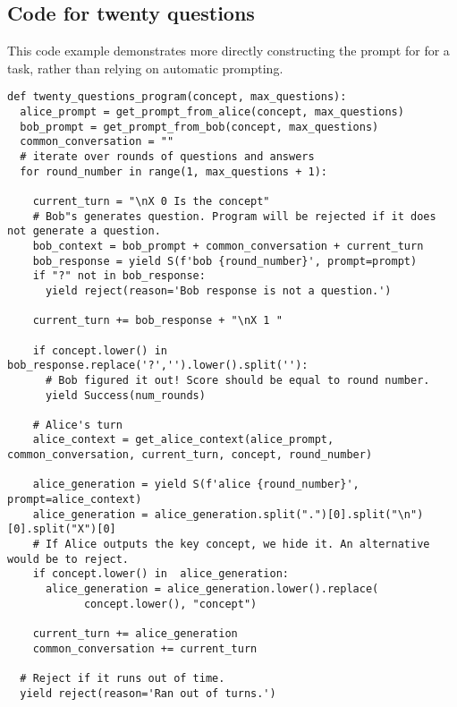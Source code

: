 \subsection{Code for twenty questions}
\label{sec:twentyCode}

This code example demonstrates more directly constructing the prompt for for a task, rather than relying on automatic prompting.
\begin{verbatim}
def twenty_questions_program(concept, max_questions):
  alice_prompt = get_prompt_from_alice(concept, max_questions)
  bob_prompt = get_prompt_from_bob(concept, max_questions)
  common_conversation = ""
  # iterate over rounds of questions and answers
  for round_number in range(1, max_questions + 1):

    current_turn = "\nX 0 Is the concept"
    # Bob"s generates question. Program will be rejected if it does not generate a question.
    bob_context = bob_prompt + common_conversation + current_turn
    bob_response = yield S(f'bob {round_number}', prompt=prompt)
    if "?" not in bob_response:
      yield reject(reason='Bob response is not a question.')

    current_turn += bob_response + "\nX 1 "

    if concept.lower() in bob_response.replace('?','').lower().split(''):
      # Bob figured it out! Score should be equal to round number.
      yield Success(num_rounds)

    # Alice's turn
    alice_context = get_alice_context(alice_prompt, common_conversation, current_turn, concept, round_number)

    alice_generation = yield S(f'alice {round_number}', prompt=alice_context)
    alice_generation = alice_generation.split(".")[0].split("\n")[0].split("X")[0]
    # If Alice outputs the key concept, we hide it. An alternative would be to reject.
    if concept.lower() in  alice_generation:
      alice_generation = alice_generation.lower().replace(
            concept.lower(), "concept")

    current_turn += alice_generation
    common_conversation += current_turn

  # Reject if it runs out of time.
  yield reject(reason='Ran out of turns.')
\end{verbatim}


